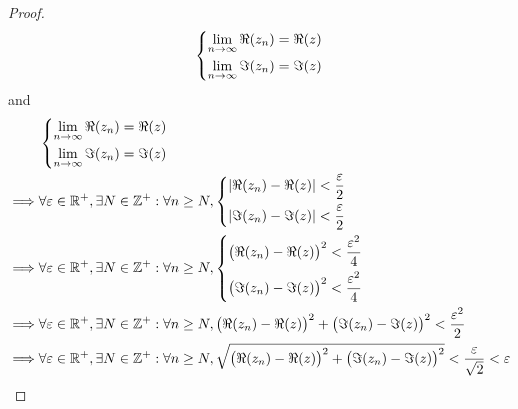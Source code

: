 \begin{proof}
\begin{align*}
\begin{dcases}
                 \lim_{n \to \infty} \Re(z_n) = \Re(z) \\
                 \lim_{n \to \infty} \Im(z_n) = \Im(z)
               \end{dcases}
  \end{align*}
  and
  \begin{align*}
             & \begin{dcases}
                 \lim_{n \to \infty} \Re(z_n) = \Re(z) \\
                 \lim_{n \to \infty} \Im(z_n) = \Im(z)
               \end{dcases}                                                                                                                                                   \\
    \implies & \forall \varepsilon \in \R^+, \exists N \in \Z^+ : \forall n \geq N, \begin{dcases}
                                                                                      \abs{\Re(z_n) - \Re(z)} < \dfrac{\varepsilon}{2} \\
                                                                                      \abs{\Im(z_n) - \Im(z)} < \dfrac{\varepsilon}{2}
                                                                                    \end{dcases}                                                                   \\
    \implies & \forall \varepsilon \in \R^+, \exists N \in \Z^+ : \forall n \geq N, \begin{dcases}
                                                                                      \big(\Re(z_n) - \Re(z)\big)^2 < \dfrac{\varepsilon^2}{4} \\
                                                                                      \big(\Im(z_n) - \Im(z)\big)^2 < \dfrac{\varepsilon^2}{4}
                                                                                    \end{dcases}                       \\
    \implies & \forall \varepsilon \in \R^+, \exists N \in \Z^+ : \forall n \geq N, \big(\Re(z_n) - \Re(z)\big)^2 + \big(\Im(z_n) - \Im(z)\big)^2 < \dfrac{\varepsilon^2}{2}                           \\
    \implies & \forall \varepsilon \in \R^+, \exists N \in \Z^+ : \forall n \geq N, \sqrt{\big(\Re(z_n) - \Re(z)\big)^2 + \big(\Im(z_n) - \Im(z)\big)^2} < \dfrac{\varepsilon}{\sqrt{2}} < \varepsilon \\

\end{align*}
\end{proof}
